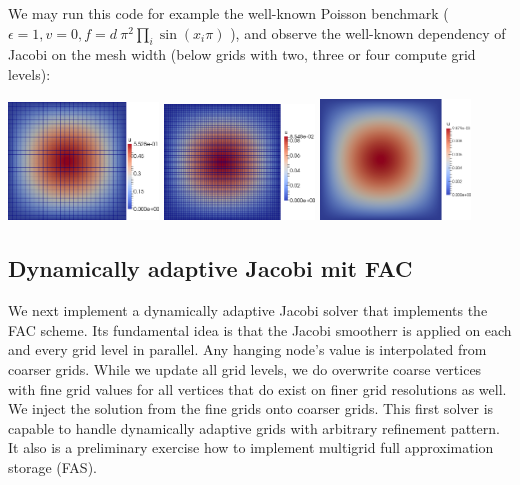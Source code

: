 \noindent
We may run this code for example the
well-known Poisson benchmark ($\epsilon = 1, v=0, f=d\ \pi ^2 \prod _i \sin
\left( x_i \pi \right) $ ), and observe the well-known dependency of Jacobi on
the mesh width (below grids with two, three or four compute grid levels):

\begin{center}
  \includegraphics[width=0.3\textwidth]{42_matrix-free-multigrid/Poisson3.png}
  \includegraphics[width=0.3\textwidth]{42_matrix-free-multigrid/Poisson4.png}
  \includegraphics[width=0.3\textwidth]{42_matrix-free-multigrid/Poisson5.png}
\end{center}


\subsection{Dynamically adaptive Jacobi mit FAC}

\noindent 
We next implement a dynamically adaptive Jacobi solver that implements the FAC
scheme.
Its fundamental idea is that the Jacobi smootherr is applied on each and every
grid level in parallel.
Any hanging node's value is interpolated from coarser grids.
While we update all grid levels, we do overwrite coarse vertices with fine grid
values for all vertices that do exist on finer grid resolutions as well.
We inject the solution from the fine grids onto coarser grids.
This first solver is capable to handle dynamically adaptive grids with
arbitrary refinement pattern.
It also is a preliminary exercise how to implement multigrid full approximation
storage (FAS).

